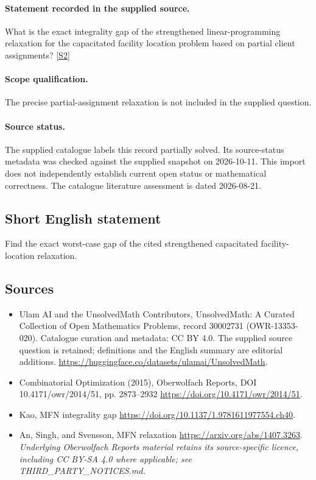 \documentclass[11pt]{article}
\begin{document}
\paragraph{Statement recorded in the supplied source.}
What is the exact integrality gap of the strengthened linear-programming relaxation for the capacitated facility location problem based on partial client assignments? \href{https://doi.org/10.4171/owr/2014/51}{[S2]}
\paragraph{Scope qualification.}
The precise partial-assignment relaxation is not included in the supplied question.
\paragraph{Source status.}
The supplied catalogue labels this record partially solved. Its source-status metadata was checked against the supplied snapshot on 2026-10-11. This import does not independently establish current open status or mathematical correctness. The catalogue literature assessment is dated 2026-08-21.
\subsection{Short English statement}
Find the exact worst-case gap of the cited strengthened capacitated facility-location relaxation.
\subsection{Sources}
\begin{itemize}
\item[S1] Ulam AI and the UnsolvedMath Contributors, UnsolvedMath: A Curated Collection of Open Mathematics Problems, record 30002731 (OWR-13353-020). Catalogue curation and metadata: CC BY 4.0. The supplied source question is retained; definitions and the English summary are editorial additions.
\url{https://huggingface.co/datasets/ulamai/UnsolvedMath}.
\item[S2] Combinatorial Optimization (2015), Oberwolfach Reports, DOI 10.4171/owr/2014/51, pp. 2873--2932
\url{https://doi.org/10.4171/owr/2014/51}.
\item[S3] Kao, MFN integrality gap
\url{https://doi.org/10.1137/1.9781611977554.ch40}.
\item[S4] An, Singh, and Svensson, MFN relaxation
\url{https://arxiv.org/abs/1407.3263}.
\textit{Underlying Oberwolfach Reports material retains its source-specific licence, including CC BY-SA 4.0 where applicable; see THIRD\_PARTY\_NOTICES.md.}
\end{itemize}
\end{document}

